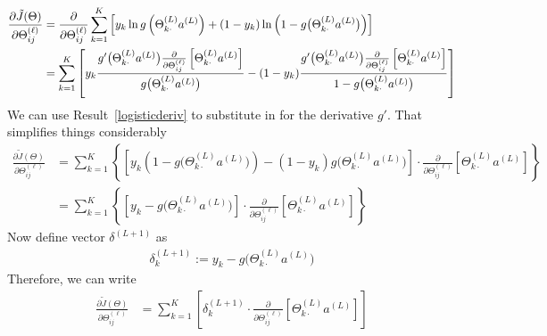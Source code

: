 \documentclass[12pt]{article}
\begin{document}
\begin{align*}
  \frac{\partial \tilde{J}(\Theta)}{\partial \Theta^{(\ell)}_{ij}}
  &=
  \frac{\partial}{\partial \Theta^{(\ell)}_{ij}}
  \sum_{k=1}^K
  \left[
    y_k \ln g\left(\Theta^{(L)}_{k\cdot} a^{(L)}\right)
    +
    (1-y_k) \ln\left(
    1-
    g\big(\Theta^{(L)}_{k\cdot} a^{(L)}\big)
  \right)
  \right]
  \\
  &=
  \sum_{k=1}^K
  \left[
  y_k
  \frac{%
    g'\big(\Theta^{(L)}_{k\cdot} a^{(L)}\big)
    \frac{\partial}{\partial \Theta^{(\ell)}_{ij}}
    \left[
    \Theta^{(L)}_{k\cdot} a^{(L)}
    \right]
  }{g\big(\Theta^{(L)}_{k\cdot} a^{(L)}\big)}
  -
  (1-y_k)
  \frac{%
    g'\big(\Theta^{(L)}_{k\cdot} a^{(L)}\big)
    \frac{\partial}{\partial \Theta^{(\ell)}_{ij}}
    \left[
    \Theta^{(L)}_{k\cdot} a^{(L)}
    \right]
  }{%
    1-
    g\big(\Theta^{(L)}_{k\cdot} a^{(L)}\big)
  }
  \right]
\end{align*}
We can use Result~\ref{logisticderiv} to substitute in for the
derivative $g'$. That simplifies things considerably
\begin{align*}
  \frac{\partial \tilde{J}(\Theta)}{\partial \Theta^{(\ell)}_{ij}}
  &=
  \sum_{k=1}^K
  \left\{
  \left[
  y_k
    \left(
    1-
    g\big(\Theta^{(L)}_{k\cdot} a^{(L)}\big)
    \right)
  -
    (1-y_k)
    g\big(\Theta^{(L)}_{k\cdot} a^{(L)}\big)
  \right]
  \cdot
  \frac{\partial}{\partial \Theta^{(\ell)}_{ij}}
  \left[
  \Theta^{(L)}_{k\cdot} a^{(L)}
  \right]
  \right\}
  \\
  &=
  \sum_{k=1}^K
  \left\{
  \left[
    y_k
  -
    g\big(\Theta^{(L)}_{k\cdot} a^{(L)}\big)
  \right]
  \cdot
  \frac{\partial}{\partial \Theta^{(\ell)}_{ij}}
  \left[
  \Theta^{(L)}_{k\cdot} a^{(L)}
  \right]
  \right\}
\end{align*}
Now define vector $\delta^{(L+1)}$ as
\begin{align*}
  \delta^{(L+1)}_k :=
  y_k - g\big(\Theta^{(L)}_{k\cdot} a^{(L)}\big)
\end{align*}
Therefore, we can write
\begin{align}
  \frac{\partial \tilde{J}(\Theta)}{\partial \Theta^{(\ell)}_{ij}}
  &=
  \sum_{k=1}^K
  \left[
    \delta^{(L+1)}_k
  \cdot
  \frac{\partial}{\partial \Theta^{(\ell)}_{ij}}
  \left[
  \Theta^{(L)}_{k\cdot} a^{(L)}
  \right]
  \right]
  \label{tildeJ}
\end{align}
\end{document}
